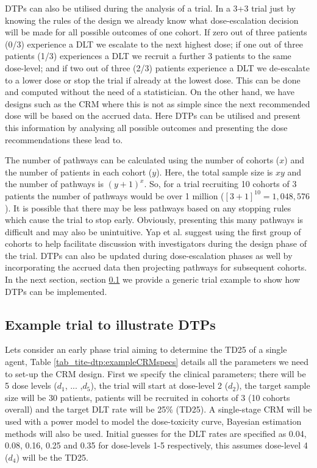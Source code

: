 DTPs can also be utilised during the analysis of a trial. In a 3+3 trial just by knowing the rules of the design we already know what dose-escalation decision will be made for all possible outcomes of one cohort. If zero out of three patients (0/3) experience a DLT we escalate to the next highest dose; if one out of three patients (1/3) experiences a DLT we recruit a further 3 patients to the same dose-level; and if two out of three (2/3) patients experience a DLT we de-escalate to a lower dose or stop the trial if already at the lowest dose. This can be done and computed without the need of a statistician. On the other hand, we have designs such as the CRM where this is not as simple since the next recommended dose will be based on the accrued data. Here DTPs can be utilised and present this information by analysing all possible outcomes and presenting the dose recommendations these lead to.

The number of pathways can be calculated using the number of cohorts ($x$) and the number of patients in each cohort ($y$). Here, the total sample size is $xy$ and the number of pathways is $(y+1)^x$. So, for a trial recruiting 10 cohorts of 3 patients the number of pathways would be over 1 million ($[3+1]^{10} = 1,048,576$). It is possible that there may be less pathways based on any stopping rules which cause the trial to stop early. Obviously, presenting this many pathways is difficult and may also be unintuitive. Yap et al. \cite{yapDoseTransitionPathways2017} suggest using the first group of cohorts to help facilitate discussion with investigators during the design phase of the trial. DTPs can also be updated during dose-escalation phases as well by incorporating the accrued data then projecting pathways for subsequent cohorts. In the next section, section \ref{tite-dtp:Example-DTPs} we provide a generic trial example to show how DTPs can be implemented.  

\subsection{Example trial to illustrate DTPs}
\label{tite-dtp:Example-DTPs}

Lets consider an early phase trial aiming to determine the TD25 of a single agent, Table \ref{tab_tite-dtp:exampleCRMspecs} details all the parameters we need to set-up the CRM design. First we specify the clinical parameters; there will be 5 dose levels ($d_1$, ... ,$d_5$), the trial will start at dose-level 2 ($d_2$), the target sample size will be 30 patients, patients will be recruited in cohorts of 3 (10 cohorts overall) and the target DLT rate will be 25\% (TD25). A single-stage CRM will be used with a power model to model the dose-toxicity curve, Bayesian estimation methods will also be used. Initial guesses for the DLT rates are specified as 0.04, 0.08, 0.16, 0.25 and 0.35 for dose-levels 1-5 respectively, this assumes dose-level 4 ($d_4$) will be the TD25. 

